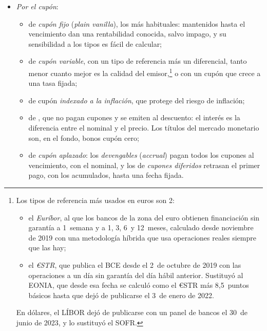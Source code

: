 \documentclass[11pt]{article}
\begin{document}
\begin{itemize}
  Cuanto peor es la calidad crediticia del emisor, más rentabilidad exige el mercado (\ref{sec:rating}). En España, a final de 2025, el mercado AIAF tenía 1,56~billones de euros de deuda pública y 366.625~millones de renta fija privada, y el MARF, el mercado alternativo para empresas medianas, superaba los 10.000~millones\nocite{BME2026InformeMercado} .
\item \emph{Por el cupón}:
  \begin{itemize}
  \item de \emph{cupón fijo} (\emph{plain vanilla}), los más habituales: mantenidos hasta el vencimiento dan una rentabilidad conocida, salvo impago, y su sensibilidad a los tipos es fácil de calcular;
  \item de \emph{cupón variable}, con un tipo de referencia más un diferencial, tanto menor cuanto mejor es la calidad del emisor,\footnote{Los tipos de referencia más usados en euros son 2:
\begin{itemize}
\item el \emph{Euríbor}, al que los bancos de la zona del euro obtienen financiación sin garantía a 1~semana y a 1, 3, 6~y 12~meses, calculado desde noviembre de 2019 con una metodología híbrida que usa operaciones reales siempre que las hay\nocite{EMMI2019Euribor};
\item el \emph{€STR}, que publica el BCE desde el 2~de octubre de 2019 con las operaciones a un día sin garantía del día hábil anterior\nocite{BCE2026ESTRWeb}. Sustituyó al EONIA, que desde esa fecha se calculó como el €STR más 8,5~puntos básicos hasta que dejó de publicarse el 3~de enero de 2022\nocite{BCE2019TransicionEONIA}.
\end{itemize}
En dólares, el LÍBOR dejó de publicarse con un panel de bancos el 30~de junio de 2023, y lo sustituyó el SOFR\nocite{FCA2026LIBOR}.} o con un cupón que crece a una tasa fijada;
  \item de cupón \emph{indexado a la inflación}, que protege del riesgo de inflación;
  \item de , que no pagan cupones y se emiten al descuento: el interés es la diferencia entre el nominal y el precio. Los títulos del mercado monetario son, en el fondo, bonos cupón cero;
  \item de \emph{cupón aplazado}: los \emph{devengables} (\emph{accrual}) pagan todos los cupones al vencimiento, con el nominal, y los de \emph{cupones diferidos} retrasan el primer pago, con los acumulados, hasta una fecha fijada.
  \end{itemize}

\end{itemize}
\end{document}
